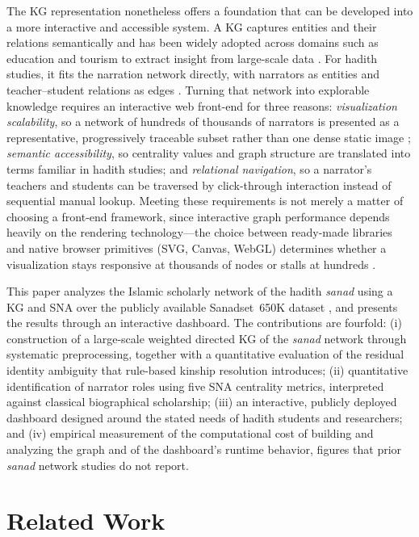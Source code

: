 \documentclass[conference]{IEEEtran}
\begin{document}
The KG representation nonetheless offers a foundation that can be developed into
a more interactive and accessible system. A KG captures entities and their
relations semantically and has been widely adopted across domains such as
education and tourism to extract insight from large-scale data \cite{Aoula2026}.
For hadith studies, it fits the narration network directly, with narrators as
entities and teacher--student relations as edges \cite{FAROOQI2024110439}.
Turning that network into explorable knowledge requires an interactive web
front-end for three reasons: \emph{visualization scalability}, so a network of
hundreds of thousands of narrators is presented as a representative, progressively
traceable subset rather than one dense static image \cite{LópezWerner04072025};
\emph{semantic accessibility}, so centrality values and graph structure are
translated into terms familiar in hadith studies; and \emph{relational
navigation}, so a narrator's teachers and students can be traversed by
click-through interaction instead of sequential manual lookup. Meeting these
requirements is not merely a matter of choosing a front-end framework, since
interactive graph performance depends heavily on the rendering technology---the
choice between ready-made libraries and native browser primitives (SVG, Canvas,
WebGL) determines whether a visualization stays responsive at thousands of nodes
or stalls at hundreds \cite{Zhao2025}.

This paper analyzes the Islamic scholarly network of the hadith \textit{sanad}
using a KG and SNA over the publicly available Sanadset~650K dataset
\cite{MGHARI2022108540}, and presents the results through an interactive
dashboard. The contributions are fourfold: (i) construction of a large-scale
weighted directed KG of the \textit{sanad} network through systematic
preprocessing, together with a quantitative evaluation of the residual identity
ambiguity that rule-based kinship resolution introduces; (ii) quantitative
identification of narrator roles using five SNA centrality metrics, interpreted
against classical biographical scholarship; (iii) an interactive, publicly
deployed dashboard designed around the stated needs of hadith students and
researchers; and (iv) empirical measurement of the computational cost of building
and analyzing the graph and of the dashboard's runtime behavior, figures that
prior \textit{sanad} network studies do not report.

\section{Related Work}
\end{document}
